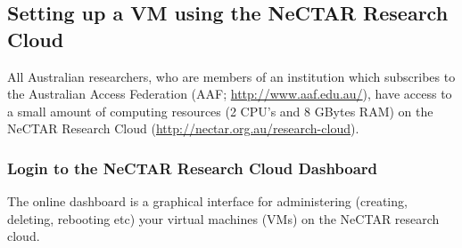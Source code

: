 \subsection{Setting up a VM using the NeCTAR Research Cloud}
All Australian researchers, who are members of an institution which subscribes
to the Australian Access Federation (AAF; \url{http://www.aaf.edu.au/}), have
access to a small amount of computing resources (2 CPU's and 8 GBytes RAM) on
the NeCTAR Research Cloud (\url{http://nectar.org.au/research-cloud}).

\subsubsection{Login to the NeCTAR Research Cloud Dashboard}
The online dashboard is a graphical interface for administering (creating,
deleting, rebooting etc) your virtual machines (VMs) on the NeCTAR research
cloud.

